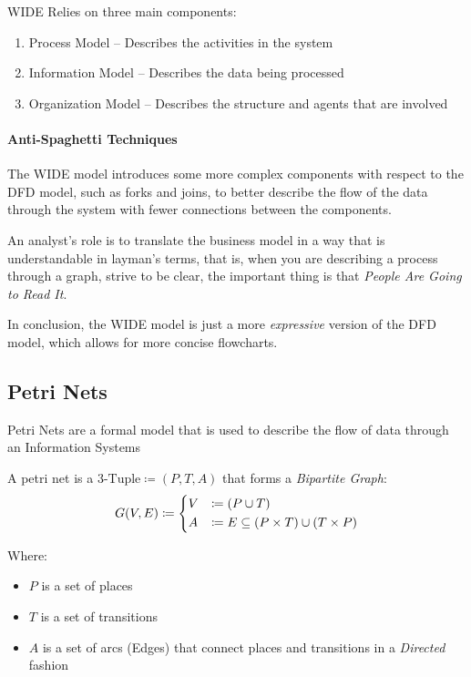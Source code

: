 \documentclass[openright, twoside, twocolumn]{report}
\begin{document}
    WIDE Relies on three main components:

    \begin{enumerate}
      \item Process Model -- Describes the activities in the system
      \item Information Model -- Describes the data being processed
      \item Organization Model -- Describes the structure and agents that are involved
    \end{enumerate}

    \paragraph{Anti-Spaghetti Techniques}

    The WIDE model introduces some more complex components with respect to the DFD model, such as forks and joins,
    to better describe the flow of the data through the system with fewer connections between the components.

    \begin{remark}
      An analyst's role is to translate the business model in a way that is understandable in layman's terms,
      that is, when you are describing a process through a graph, strive to be clear, the important thing
      is that \emph{People Are Going to Read It}.
    \end{remark}

    In conclusion, the WIDE model is just a more \emph{expressive} version of the DFD model, which
    allows for more concise flowcharts.

    \subsection{Petri Nets}

    Petri Nets are a formal model that is used to describe the flow of data through an Information Systems

    \begin{definition}
      \label{def:petri-nets}
      A petri net is a $\text{3-Tuple} \coloneqq  (P, T, A)$
      that forms a \emph{Bipartite Graph}:
      \[
        G(V, E) \coloneqq \begin{dcases}
          V &\coloneqq (P \cup T)\\
          A &\coloneqq E \subseteq  (P \times T) \cup (T \times P)
        \end{dcases}\]

    Where:

    \begin{itemize}
      \item $P$ is a set of places
      \item $T$ is a set of transitions
      \item $A$ is a set of arcs (Edges) that connect places and transitions in a \emph{Directed} fashion
    \end{itemize}
    \end{definition}
\end{document}
